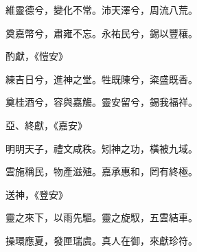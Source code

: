 \begin{pinyinscope}
 維靈德兮，變化不常。沛天澤兮，周流八荒。



 奠嘉幣兮，肅雍不忘。永祐民兮，錫以豐穰。



 酌獻，《愷安》



 練吉日兮，進神之堂。牲既陳兮，粢盛既香。



 奠桂酒兮，容與嘉觴。靈安留兮，錫我福祥。



 亞、終獻，《嘉安》



 明明天子，禮文咸秩。矧神之功，橫被九域。



 雲施稱民，物產滋殖。嘉承惠和，罔有終極。



 送神，《登安》



 靈之來下，以雨先驅。靈之旋馭，五雲結車。



 操環應夏，發匣瑞虞。真人在御，來獻珍符。



\end{pinyinscope}